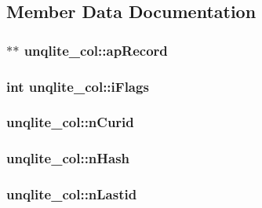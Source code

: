 \subsection{Member Data Documentation}
\hypertarget{structunqlite__col_afc5744315e9ac9e41f7416dacb0d7eb8}{
\subsubsection[{ap\-Record}]{$\ast$$\ast$ unqlite\-\_\-col\-::ap\-Record}}\label{dc/de4/structunqlite__col_afc5744315e9ac9e41f7416dacb0d7eb8}
\hypertarget{structunqlite__col_a294a606c5329d013d55d1f958a51362e}{
\subsubsection[{i\-Flags}]{\setlength{\rightskip}{0pt plus 5cm}int unqlite\-\_\-col\-::i\-Flags}}\label{dc/de4/structunqlite__col_a294a606c5329d013d55d1f958a51362e}
\hypertarget{structunqlite__col_a103468d3e0bf91441d82d0cb13318d62}{
\subsubsection[{n\-Curid}]{ unqlite\-\_\-col\-::n\-Curid}}\label{dc/de4/structunqlite__col_a103468d3e0bf91441d82d0cb13318d62}
\hypertarget{structunqlite__col_a07b17bba19cb585cc37287dbbbc9152d}{
\subsubsection[{n\-Hash}]{ unqlite\-\_\-col\-::n\-Hash}}\label{dc/de4/structunqlite__col_a07b17bba19cb585cc37287dbbbc9152d}
\hypertarget{structunqlite__col_af8dbb5199b5a4f58e1549d51dfbb6a03}{
\subsubsection[{n\-Lastid}]{ unqlite\-\_\-col\-::n\-Lastid}}\label{dc/de4/structunqlite__col_af8dbb5199b5a4f58e1549d51dfbb6a03}
